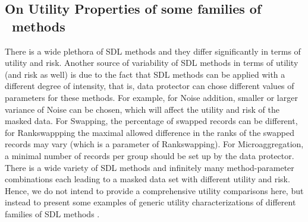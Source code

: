 \documentclass[12pt]{article}
\begin{document}

\subsection{On Utility Properties of some families of \SDL\ methods}
\label{subsec.simulateddata}

There is a wide plethora of SDL methods and they differ significantly in terms of utility  and risk. Another source of variability of SDL methods in terms of utility (and risk as well) is due to the fact that SDL methods can be applied with a different degree of intensity, that is, data protector can chose  different values of parameters for these methods. 
For example, for Noise addition, smaller or larger variance of Noise can be chosen, which will affect the utility and risk of the masked data. For Swapping, the percentage of swapped records can be different, for Rankswappping  the  maximal allowed difference in the ranks of the swapped records  may vary (which is a parameter of Rankswapping). For Microaggregation, a minimal number of records per group should be set up by the data protector.  There is a wide variety of SDL methods and  infinitely many method-parameter combinations each leading to a masked data set with different utility and risk. Hence, we do not intend to provide a comprehensive utility comparisons here, but instead to present some examples of generic utility characterizations of different families of SDL methods . 
\end{document}
